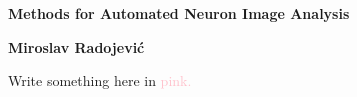 \documentclass[12pt, oneside]{report}
\begin{document}
	\pagecolor{background}%
	\BgThispage
	\thispagestyle{empty}
	\begin{center}
		{\Huge\bf Methods for Automated Neuron Image Analysis\\}%
	\end{center}
	\vfill
	\begin{center}
		{\Large\bf Miroslav Radojevi\'{c}}
	\end{center}
	Write something here in \textcolor{pink}{pink.}
\end{document}
